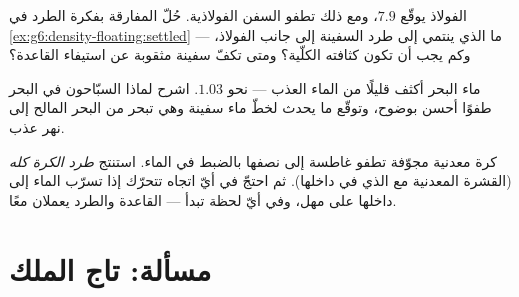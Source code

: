 \begin{exercise}[$\star\star$]\label{exo:g6:density-floating:10}
الفولاذ يوقّع $7.9$، ومع ذلك تطفو السفن الفولاذية. حُلّ
المفارقة بفكرة الطرد في
\cref{ex:g6:density-floating:settled} --- ما الذي ينتمي إلى
طرد السفينة إلى جانب الفولاذ، وكم يجب أن تكون كثافته الكلّية؟
ومتى تكفّ سفينة مثقوبة عن استيفاء القاعدة؟
\end{exercise}

\begin{exercise}[$\star\star$]\label{exo:g6:density-floating:11}
ماء البحر أكثف قليلًا من الماء العذب --- نحو $1.03$. اشرح لماذا
 السبّاحون في البحر طفوًا أحسن بوضوح، وتوقّع ما يحدث لخطّ
ماء سفينة وهي تبحر من البحر المالح إلى نهر عذب.
\end{exercise}

\begin{exercise}[$\star\star\star$]\label{exo:g6:density-floating:12}
كرة معدنية مجوّفة تطفو غاطسة إلى نصفها بالضبط في الماء.
استنتج  \emph{طرد الكرة كله} (القشرة المعدنية مع 
الذي في داخلها). ثم احتجّ في أيّ اتجاه تتحرّك إذا تسرّب الماء
إلى داخلها على مهل، وفي أيّ لحظة تبدأ  --- القاعدة
والطرد يعملان معًا.
\end{exercise}

\section{مسألة: تاج الملك}


